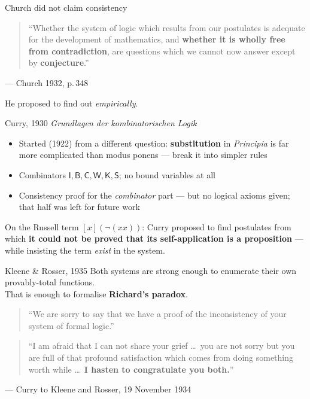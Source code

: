 \documentclass[aspectratio=169,11pt]{beamer}
\newcommand{\key}[1]{{\color{accent}\textbf{#1}}}
\begin{document}
\begin{frame}{Church did not claim consistency}
  \vfill
  \begin{quote}
    ``Whether the system of logic which results from our postulates is adequate
    for the development of mathematics, and \textbf{whether it is wholly free from
    contradiction}, are questions which we cannot now answer except by
    \textbf{conjecture}.''
  \end{quote}
  \hfill{\footnotesize --- Church 1932, p.\,348}
  \vfill
  \pause
  \begin{center}\large He proposed to find out \emph{empirically}.\end{center}
  \vfill
\end{frame}

\begin{frame}{Curry, 1930}
  \textit{Grundlagen der kombinatorischen Logik}
  \vfill
  \begin{itemize}\itemsep0.8em
    \item Started (1922) from a different question: \key{substitution} in \emph{Principia}
          is far more complicated than modus ponens --- break it into simpler rules
    \item Combinators $\mathsf{I},\mathsf{B},\mathsf{C},\mathsf{W},\mathsf{K},\mathsf{S}$; no bound variables at all
    \item Consistency proof for the \emph{combinator} part --- but no logical
          axioms given; that half was left for future work
  \end{itemize}
  \vfill
  \pause
  \begin{center}\small
    On the Russell term $[x](\neg(xx))$: Curry proposed to find postulates
    from which \key{it could not be proved that its self-application is a proposition}
    --- while insisting the term \emph{exist} in the system.
  \end{center}
\end{frame}

\begin{frame}{Kleene \& Rosser, 1935}
  \vfill
  Both systems are strong enough to enumerate their own provably-total functions.\\
  That is enough to formalise \key{Richard's paradox}.
  \vfill
  \begin{quote}\small
    ``We are sorry to say that we have a proof of the inconsistency of your
    system of formal logic.''
  \end{quote}
  \pause
  \begin{quote}\small
    ``I am afraid that I can not share your grief \dots\ you are not sorry but you
    are full of that profound satisfaction which comes from doing something worth
    while \dots\ \textbf{I hasten to congratulate you both.}''
  \end{quote}
  \hfill{\footnotesize --- Curry to Kleene and Rosser, 19 November 1934}
\end{frame}
\end{document}
